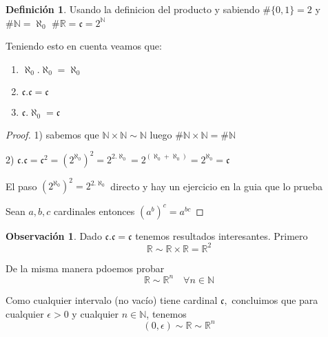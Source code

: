 \documentclass[12pt]{article}
\newcommand{\n}{\aleph_{0}}
\newcommand{\R}{\mathbb{R}}
\newcommand{\N}{\mathbb{N}}
\theoremstyle{definition}
\newtheorem{definition}{Definición}[section]
\newtheorem*{remark}{Observación}
\begin{document}
\begin{definition}
 Usando la definicion del producto y sabiendo $\# \{0,1\} = 2$ y $\# \N = \n$
  $\# \R = \mathfrak{c} = 2^{\N}$ 

  Teniendo esto en cuenta veamos que:

  \begin{enumerate}
    \item $\n.\n = \n$
    \item $\mathfrak{c}.\mathfrak{c} = \mathfrak{c}$
    \item $\mathfrak{c}.\n = \mathfrak{c}$
    \end{enumerate}

    \begin{proof}
    1) sabemos que $\N \times \N \sim \N$ luego $\# \N \times \N = \# \N$

  2) $\mathfrak{c}.\mathfrak{c} = \mathfrak{c}^2 = (2^{\n})^2 = 2^{2.\n} = 2^{(\n + \n)} = 2 ^{\n} = \mathfrak{c}$
  
  El paso $(2^{\n})^2 = 2^{2.\n}$ directo y hay un ejercicio en la guia que lo prueba 

  Sean $a,b,c$ cardinales entonces $(a^b)^c = a^{bc}$ 
\end{proof} 
\end{definition}

\begin{remark}
  Dado $\mathfrak{c}.\mathfrak{c} = \mathfrak{c}$ tenemos resultados interesantes. 
  Primero $$\R \sim \R \times \R = \R^2$$

  De la misma manera pdoemos probar $$\R \sim \R^n \quad \forall n \in \N $$

Como cualquier intervalo (no vacío) tiene cardinal $\mathfrak{c},$ concluimos que para cualquier $\epsilon > 0$ y cualquier $n \in \N$, tenemos $$(0,\epsilon)\sim \R \sim \R^n$$
\end{remark}
\end{document}

